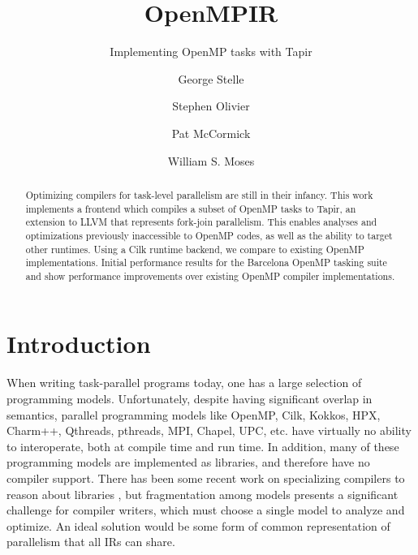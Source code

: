 \documentclass[sigconf]{acmart}
\begin{document}
\title{OpenMPIR}
\subtitle{Implementing OpenMP tasks with Tapir}
\author{George Stelle}

\author{Stephen Olivier}

\author{Pat McCormick}

\author{William S. Moses}

\begin{abstract}
Optimizing compilers for task-level parallelism are still in their infancy.
This work implements a frontend which compiles a subset of OpenMP tasks to
Tapir, an extension to LLVM that represents fork-join parallelism. This enables
analyses and optimizations previously inaccessible to OpenMP codes, as well as
the ability to target other runtimes. Using a Cilk runtime backend, we compare
to existing OpenMP implementations. Initial performance results for the
Barcelona OpenMP tasking suite and show performance improvements over existing
OpenMP compiler implementations. 
\end{abstract}

\maketitle

\section{Introduction}

When writing task-parallel programs today, one has a large selection of
programming models. Unfortunately, despite having significant overlap in
semantics, parallel programming models like OpenMP, Cilk, Kokkos, HPX, Charm++,
Qthreads, pthreads, MPI, Chapel, UPC, etc. have virtually no ability to
interoperate, both at compile time and run time. In addition, many of these
programming models are implemented as libraries, and therefore have no compiler
support. There has been some recent work on specializing compilers to reason
about libraries \cite{kokkos}, but fragmentation among models presents a
significant challenge for compiler writers, which must choose a single model to
analyze and optimize. An ideal solution would be some form of common
representation of parallelism that all IRs can share.
\end{document}
